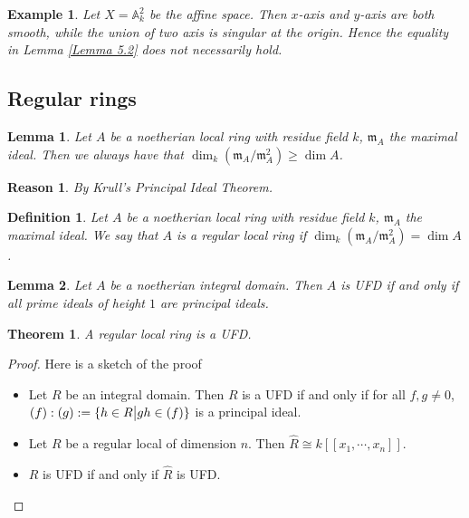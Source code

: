 \documentclass{ctexart}
\newtheorem{definition}{Definition}[section]
\newtheorem{theorem}{Theorem}[section]
\newtheorem{lemma}{Lemma}[section]
\newtheorem{reason}{Reason}[section]
\newtheorem{example}{Example}[section]
\begin{document}
\begin{example}
    Let $X = \mathbb{A}_{k}^{2}$ be the affine space.
    Then $x$-axis and $y$-axis are both smooth, while the union of two axis is singular at the origin.
    Hence the equality in Lemma \ref{Lemma 5.2} does not necessarily hold.
\end{example}

\subsection{Regular rings}
\label{subsection:Smooth_Points_and_Smooth_Morphisms_Regular_rings}

\begin{lemma}
    Let $A$ be a noetherian local ring with residue field $k$, $\mathfrak{m}_{A}$ the maximal ideal.
    Then we always have that $\dim_{k} (\mathfrak{m}_{A}/\mathfrak{m}_{A}^{2}) \ge \dim A$.
    \label{Lemma 5.3}
\end{lemma}
\begin{reason}
    By Krull's Principal Ideal Theorem.
\end{reason}
\begin{definition}
    Let $A$ be a noetherian local ring with residue field $k$, $\mathfrak{m}_{A}$ the maximal ideal.
    We say that $A$ is a regular local ring if $\dim_{k} (\mathfrak{m}_{A}/\mathfrak{m}_{A}^{2}) = \dim A$.
\end{definition}
\begin{lemma}
    Let $A$ be a noetherian integral domain.
    Then $A$ is UFD if and only if all prime ideals of height $1$ are principal ideals.
    \label{Lemma 5.4}
\end{lemma}
\begin{theorem}
    A regular local ring is a UFD.
    \label{Theorem 5.1}
\end{theorem}
\begin{proof}
    Here is a sketch of the proof
    \begin{itemize}
        \item Let $R$ be an integral domain.
        Then $R$ is a UFD if and only if for all $f,g \neq 0$, $(f) : (g) := \{h\in R \big{|} gh\in (f)\}$ is a principal ideal.
        \item Let $R$ be a regular local of dimension $n$.
        Then $\widehat{R} \cong k[[x_{1}, \cdots, x_{n}]]$. 
        \item $R$ is UFD if and only if $\widehat{R}$ is UFD. 
    \end{itemize}
    \vspace{-1.5\baselineskip} %
\end{proof}
\end{document}
